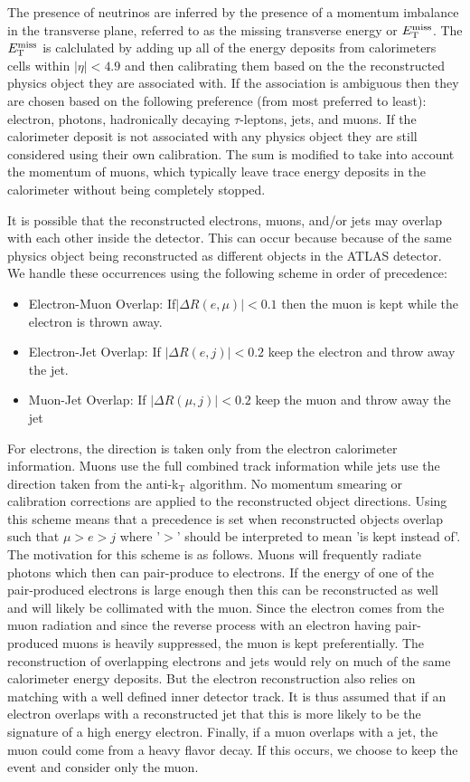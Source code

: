 The presence of neutrinos are inferred by the presence of a momentum
imbalance in the transverse plane, referred to as the missing
transverse energy or $E_{\mathrm{T}}^{\mathrm{miss}}$. The $E_{\mathrm{T}}^{\mathrm{miss}}$ is calclulated by 
adding up all of 
the energy deposits from calorimeters cells within $|\eta| < 4.9$
and then calibrating them based on the the reconstructed
physics object they are associated with.
If the association is ambiguous then they are chosen based on the following
preference (from most preferred to least): electron, photons, 
hadronically decaying $\tau$-leptons, jets, and muons.
If the calorimeter deposit is not associated with any physics object
they are still considered using their own calibration.
The sum is modified to take into account the momentum of muons,
which typically leave trace energy deposits
in the calorimeter without being completely stopped.



It is possible that the reconstructed electrons, muons, and/or jets
may overlap with each other inside the detector.  This can occur
because because of the same physics object being reconstructed as different
objects in the ATLAS detector.  We handle these occurrences using the following
scheme in order of precedence:
\begin{itemize}
	\item Electron-Muon Overlap: If$|\Delta R(e,\mu)| < 0.1$ then the  muon is kept while the electron is thrown away.
	\item Electron-Jet Overlap: If $|\Delta R(e,j)| < 0.2$ keep the electron and throw away the jet.
	\item Muon-Jet Overlap: If $|\Delta R(\mu,j)| < 0.2$ keep the muon and throw away the jet
\end{itemize}
For electrons, the direction is taken only from the electron calorimeter
information.  Muons use the full combined track information while jets
use the direction taken from the anti-k$_{\mathrm{T}}$  algorithm.
No momentum smearing or calibration corrections
are applied to the reconstructed object directions. 
Using this scheme means that a precedence is set when 
reconstructed objects overlap such that $\mu > e > j$ where '$>$' should
be interpreted to mean 'is kept instead of'. The motivation for this scheme
is as follows. Muons will frequently radiate photons which then can pair-produce
to electrons.  If the energy of one of the pair-produced electrons is 
large enough then this can be reconstructed as well and will likely be collimated
with the muon.  Since the electron comes from the muon radiation and
since the reverse process with an electron having pair-produced muons
is heavily suppressed, the muon is kept preferentially.  The reconstruction
of overlapping electrons and jets
would rely on much of the same calorimeter energy deposits.  But the electron
reconstruction also relies on matching with a well defined inner detector
track.  It is thus assumed that if an electron overlaps with a reconstructed
jet that this is more likely to be the signature of a high energy electron.
Finally, if a muon overlaps with a jet, the muon could come from a heavy flavor 
decay. If this occurs, we choose to keep the event and consider only the muon.


